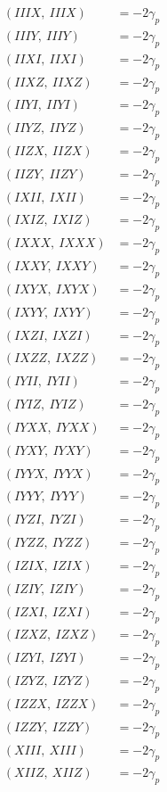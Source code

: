 \documentclass{article}
\begin{document}
\begin{align*}
  (IIIX,\ IIIX) &= - 2 \gamma_{p} \\
  (IIIY,\ IIIY) &= - 2 \gamma_{p} \\
  (IIXI,\ IIXI) &= - 2 \gamma_{p} \\
  (IIXZ,\ IIXZ) &= - 2 \gamma_{p} \\
  (IIYI,\ IIYI) &= - 2 \gamma_{p} \\
  (IIYZ,\ IIYZ) &= - 2 \gamma_{p} \\
  (IIZX,\ IIZX) &= - 2 \gamma_{p} \\
  (IIZY,\ IIZY) &= - 2 \gamma_{p} \\
  (IXII,\ IXII) &= - 2 \gamma_{p} \\
  (IXIZ,\ IXIZ) &= - 2 \gamma_{p} \\
  (IXXX,\ IXXX) &= - 2 \gamma_{p} \\
  (IXXY,\ IXXY) &= - 2 \gamma_{p} \\
  (IXYX,\ IXYX) &= - 2 \gamma_{p} \\
  (IXYY,\ IXYY) &= - 2 \gamma_{p} \\
  (IXZI,\ IXZI) &= - 2 \gamma_{p} \\
  (IXZZ,\ IXZZ) &= - 2 \gamma_{p} \\
  (IYII,\ IYII) &= - 2 \gamma_{p} \\
  (IYIZ,\ IYIZ) &= - 2 \gamma_{p} \\
  (IYXX,\ IYXX) &= - 2 \gamma_{p} \\
  (IYXY,\ IYXY) &= - 2 \gamma_{p} \\
  (IYYX,\ IYYX) &= - 2 \gamma_{p} \\
  (IYYY,\ IYYY) &= - 2 \gamma_{p} \\
  (IYZI,\ IYZI) &= - 2 \gamma_{p} \\
  (IYZZ,\ IYZZ) &= - 2 \gamma_{p} \\
  (IZIX,\ IZIX) &= - 2 \gamma_{p} \\
  (IZIY,\ IZIY) &= - 2 \gamma_{p} \\
  (IZXI,\ IZXI) &= - 2 \gamma_{p} \\
  (IZXZ,\ IZXZ) &= - 2 \gamma_{p} \\
  (IZYI,\ IZYI) &= - 2 \gamma_{p} \\
  (IZYZ,\ IZYZ) &= - 2 \gamma_{p} \\
  (IZZX,\ IZZX) &= - 2 \gamma_{p} \\
  (IZZY,\ IZZY) &= - 2 \gamma_{p} \\
  (XIII,\ XIII) &= - 2 \gamma_{p} \\
  (XIIZ,\ XIIZ) &= - 2 \gamma_{p} \\

\end{align*}
\end{document}
